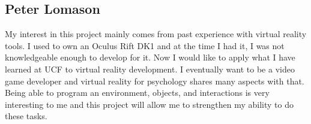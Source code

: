 \documentclass[a4paper,10pt,twoside]{article}
\begin{document}
	\subsection{Peter Lomason}
	My interest in this project mainly comes from past experience with virtual reality tools. I used to own an Oculus Rift DK1 and at the time I had it, 
	I was not knowledgeable enough to develop for it. Now I would like to apply what I have learned at UCF to virtual reality development. I eventually want to be
	a video game developer and virtual reality for psychology shares many aspects with that. Being able to program an environment, objects, and interactions is very
	interesting to me and this project will allow me to strengthen my ability to do these tasks.
\pagebreak





\end{document}
